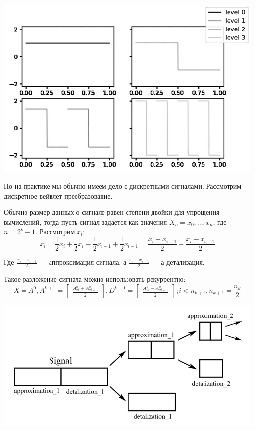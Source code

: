 \documentclass[a4paper]{article}
\begin{document}
	\begin{center}
		\includegraphics[scale=0.3]{./img3.jpg}
	\end{center}
	
	Но на практике мы обычно имеем дело с дискретными сигналами. Рассмотрим дискретное вейвлет-преобразование.
	
	Обычно размер данных о сигнале равен степени двойки для упрощения вычислений, тогда пусть сигнал задается как значения $X_n = x_0, ..., x_n$, где $n=2^k-1$. Рассмотрим $x_i$:
	$$ x_i = \frac{1}{2}x_i + \frac{1}{2}x_i - \frac{1}{2}x_{i-1} + \frac{1}{2}x_{i-1} =
	\frac{x_{i} + x_{i-1}}{2} + \frac{x_{i} - x_{i-1}}{2}$$
	
	Где $\frac{x_{i} + x_{i-1}}{2}$ --- аппроксимация сигнала, а $\frac{x_{i} - x_{i-1}}{2}$ --- а детализация.
	
	Такое разложение сигнала можно использовать рекуррентно:
	$$
		X = A^0,
		A^{k + 1} = 
		\begin{bmatrix}
			\frac{A^k_{2i} + A^k_{2i + 1}}{2}
		\end{bmatrix},
		D^{k + 1} = 
		\begin{bmatrix}
		\frac{A^k_{2i} - A^k_{2i + 1}}{2}
		\end{bmatrix};
		i < n_{k+1}, n_{k+1} = \frac{n_k}{2}
	$$
	
	\begin{center}
		\includegraphics[scale=0.4]{./img4.jpg}
	\end{center}
	
\end{document}
